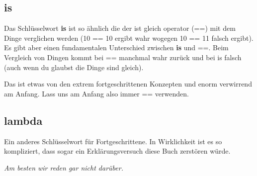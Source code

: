\subsection*{is}

Das Schlüsselwort \textbf{is} ist so ähnlich die der ist gleich operator (==) mit dem Dinge verglichen werden (10 == 10 ergibt wahr wogegen 10 == 11 falsch ergibt). Es gibt aber einen fundamentalen Unterschied zwischen \textbf{is} und ==. Beim Vergleich von Dingen kommt bei == manchmal wahr zurück und bei is falsch (auch wenn du glaubst die Dinge sind gleich).
\par
Das ist etwas von den extrem fortgeschrittenen Konzepten und enorm verwirrend am Anfang. Lass uns am Anfang also immer == verwenden.

\subsection*{lambda}

Ein anderes Schlüsselwort für Fortgeschrittene. In Wirklichkeit ist es so kompliziert, dass sogar ein Erklärungsversuch diese Buch zerstören würde.
\par
\emph{Am besten wir reden gar nicht darüber.}

